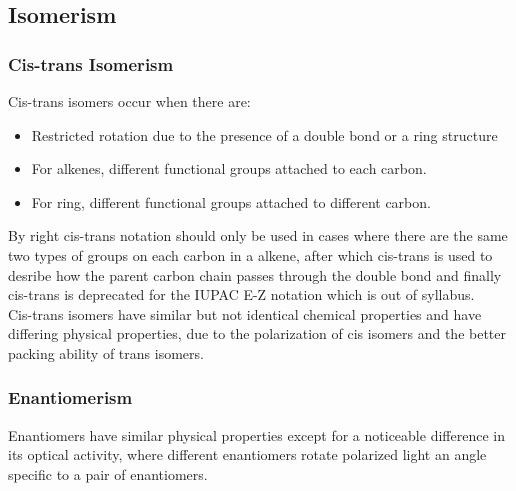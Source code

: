 \documentclass[../main]{subfiles}
\begin{document}

	\subsection{Isomerism}

	\subsubsection{Cis-trans Isomerism}


	Cis-trans isomers occur when there are:

	\begin{itemize}
		\item Restricted rotation due to the presence of a  double bond or a ring structure
		\item For alkenes, different functional groups attached to each carbon.
		\item For ring, different functional groups attached to different carbon.
	\end{itemize}

	By right cis-trans notation should only be used in cases where there are the same two types of groups on each carbon in a alkene, after which cis-trans is used to desribe how the parent carbon chain passes through the double bond and finally cis-trans is deprecated for the IUPAC E-Z notation which is out of syllabus. \\

	Cis-trans isomers have similar but not identical chemical properties and have differing physical properties, due to the polarization of cis isomers and the better packing ability of trans isomers.

	\subsubsection{Enantiomerism}


	Enantiomers have similar physical properties except for a noticeable difference in its optical activity, where different enantiomers rotate polarized light an angle specific to a pair of enantiomers. \\
\end{document}
